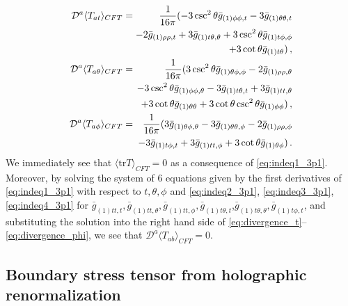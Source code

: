 \documentclass[aps,letterpaper,twocolumn,nofootinbib]{revtex4}
\numberwithin{equation}{section}
\begin{document}
\begin{eqnarray}
\label{eq:divergence_t}
\mathcal{D}^a \langle T_{at}\rangle_{CFT}&=&\frac{1}{16\pi}(-3 \csc ^2\theta  \bar{g}_{(1) \phi \phi ,t}-3 \bar{g}_{(1)\theta \theta ,t}\nonumber\\
&&\hspace{-1.0cm}-2 \bar{g}_{(1) \rho \rho ,t}+3 \bar{g}_{(1) \text{$t$$\theta $},\theta }+3 \csc^2\theta \bar{g}_{(1) \text{$t$$\phi $},\phi }\nonumber\\
&&\hspace{-1.0cm}+3 \cot \theta  \bar{g}_{(1)\text{$t$$\theta $}})\,, \\
\label{eq:divergence_theta}
\mathcal{D}^a \langle T_{a\theta}\rangle_{CFT}&=&\frac{1}{16\pi}(3 \csc ^2\theta  \bar{g}_{(1)\theta \phi ,\phi }-2 \bar{g}_{(1) \rho \rho ,\theta } \nonumber \\
&&\hspace{-1.0cm} -3 \csc^2\theta \bar{g}_{(1) \phi \phi ,\theta }-3 \bar{g}_{(1) \text{$t$$\theta $},t}+3\bar{g}_{(1) \text{$tt$},\theta } \nonumber\\
   &&\hspace{-1.0cm}+3 \cot \theta  \bar{g}_{(1)\theta \theta }+3 \cot   \theta \csc ^2\theta  \bar{g}_{(1) \phi \phi })\,,\\
\label{eq:divergence_phi}
\mathcal{D}^a \langle T_{a\phi}\rangle_{CFT}&=&\frac{1}{16\pi}(3 \bar{g}_{(1)\theta \phi ,\theta }-3 \bar{g}_{(1)\theta \theta ,\phi }-2 \bar{g}_{(1) \rho\rho ,\phi }\nonumber\\
   &&\hspace{-1.0cm}-3 \bar{g}_{(1) \text{$t$$\phi $},t}+3 \bar{g}_{(1) \text{$tt$},\phi }+3 \cot\theta \bar{g}_{(1)\theta \phi })\,.
\end{eqnarray}
We immediately see that $\langle \text{tr}T\rangle_{CFT}=0$ as a consequence of \eqref{eq:indeq1_3p1}.
Moreover, by solving the system of 6 equations given by the first derivatives of \eqref{eq:indeq1_3p1} with respect to $t,\theta,\phi$ and \eqref{eq:indeq2_3p1}, \eqref{eq:indeq3_3p1}, \eqref{eq:indeq4_3p1} for $\bar{g}_{(1) \text{$tt$},t},\bar{g}_{(1) \text{$tt$},\theta},\bar{g}_{(1) \text{$tt$},\phi },\bar{g}_{(1) \text{$t$$\theta $},t}$,$\bar{g}_{(1)\text{$t$$\theta $},\theta },\bar{g}_{(1) \text{$t$$\phi $},t}$, and substituting the solution into the right hand side of \eqref{eq:divergence_t}--\eqref{eq:divergence_phi}, we see that $\mathcal{D}^a \langle T_{ab}\rangle_{CFT}=0$.

\subsection{Boundary stress tensor from holographic renormalization}
\label{sec:HoloRen}
\end{document}
